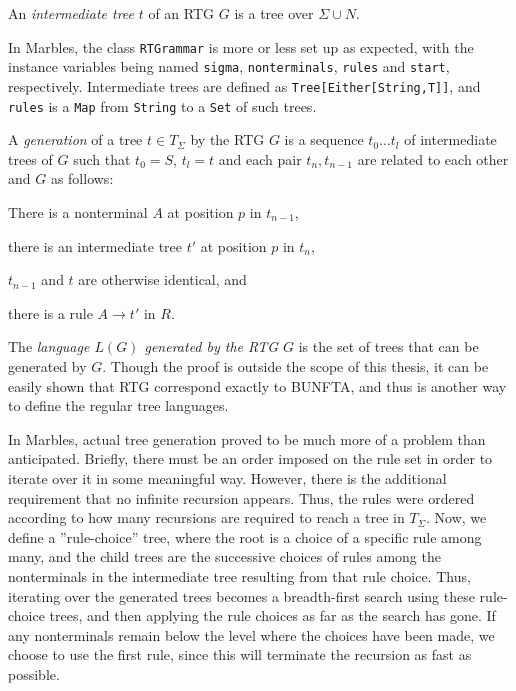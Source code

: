 An \emph{intermediate tree} $t$ of an RTG $G$ is a tree over $\Sigma \cup N$.

In Marbles, the class \texttt{RTGrammar} is more or less set up as
expected, with the instance variables being named \texttt{sigma},
\texttt{nonterminals}, \texttt{rules} and \texttt{start}, respectively.
Intermediate trees are defined as \texttt{Tree[Either[String,T]]}, and
\texttt{rules} is a \texttt{Map} from \texttt{String} to a \texttt{Set} of
such trees.

A \emph{generation} of a tree $t \in T_\Sigma$ by the RTG $G$ is a sequence $t_0\ldots
t_l$
of intermediate trees of $G$ such that $t_0 = S$, $t_l = t$ and each pair
$t_n, t_{n-1}$ are related to each other and $G$ as follows:
\begin{compactitem}
\item There is a nonterminal $A$ at position $p$ in $t_{n-1}$,
\item there is an intermediate tree $t'$ at position $p$ in $t_n$,
\item $t_{n-1}$ and $t$ are otherwise identical, and
\item there is a rule $A \rightarrow t'$ in $R$.
\end{compactitem}

The \emph{language $L(G)$ generated by the RTG $G$} is the set of trees
that can be generated by $G$. Though the proof is outside the scope of this
thesis, it can be easily shown that RTG correspond exactly to BUNFTA, and
thus is another way to define the regular tree languages.

In Marbles, actual tree generation proved to be much more of a problem than
anticipated. Briefly, there must be an order imposed on the rule set in
order to iterate over it in some meaningful way. However, there is the
additional requirement that no infinite recursion appears. Thus, the rules
were ordered according to how many recursions are required to reach a tree
in $T_\Sigma$. Now, we define a ''rule-choice'' tree, where the root is a
choice of a specific rule among many, and the child trees are the
successive choices of rules among the nonterminals in the intermediate tree
resulting from that rule choice. Thus, iterating over the generated trees
becomes a breadth-first search using these rule-choice trees, and then
applying the rule choices as far as the search has gone. If any
nonterminals remain below the level where the choices have been made, we
choose to use the first rule, since this will terminate the recursion as
fast as possible.

